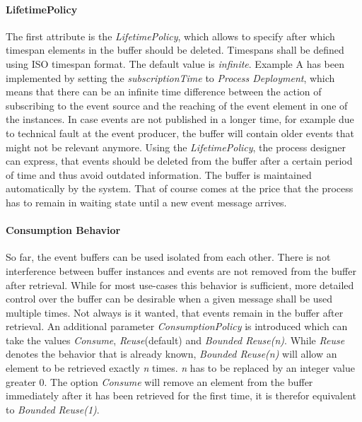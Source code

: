 \paragraph{LifetimePolicy\newline}

The first attribute is the \textit{LifetimePolicy}, which allows to specify after which timespan elements in the buffer should be deleted. Timespans shall be defined using ISO timespan format. 
The default value is \textit{infinite}.
Example A has been implemented by setting the \textit{subscriptionTime} to \textit{Process Deployment}, which means that there can be an infinite time difference between the action of subscribing to the event source and the reaching of the event element in one of the instances.
In case events are not published in a longer time, for example due to technical fault at the event producer, the buffer will contain older events that might not be relevant anymore.
Using the \textit{LifetimePolicy}, the process designer can express, that events should be deleted from the buffer after a certain period of time and thus avoid outdated information. The buffer is maintained automatically by the system.
That of course comes at the price that the process has to remain in waiting state until a new event message arrives.

\paragraph{Consumption Behavior\newline}

So far, the event buffers can be used isolated from each other. There is not interference between buffer instances and events are not removed from the buffer after retrieval.
While for most use-cases this behavior is sufficient, more detailed control over the buffer can be desirable when a given message shall be used multiple times.
Not always is it wanted, that events remain in the buffer after retrieval.
An additional parameter \textit{ConsumptionPolicy} is introduced which can take the values \textit{Consume}, \textit{Reuse}(default) and \textit{Bounded Reuse(n)}.
While \textit{Reuse} denotes the behavior that is already known, \textit{Bounded Reuse(n)} will allow an element to be retrieved exactly \textit{n} times. \textit{n} has to be replaced by an integer value greater 0.
The option \textit{Consume} will remove an element from the buffer immediately after it has been retrieved for the first time, it is therefor equivalent to \textit{Bounded Reuse(1)}.

